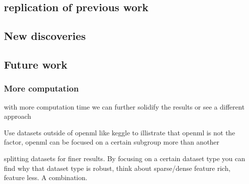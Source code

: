 \documentclass[a4paper,10pt]{article}
\begin{document}
\subsection{replication of previous work}

\subsection{New discoveries}




\subsection{Future work}
\subsubsection{More computation}
with more computation time we can further solidify the results or see a different approach

Use datasets outside of openml like keggle%
to illistrate that openml is not the factor, openml can be focused on a certain subgroup more than another 

splitting datasets for finer results. By focusing on a certain dataset type you can find why that dataset type is robust, think about sparse/dense feature rich, feature less. A combination.
\end{document}
